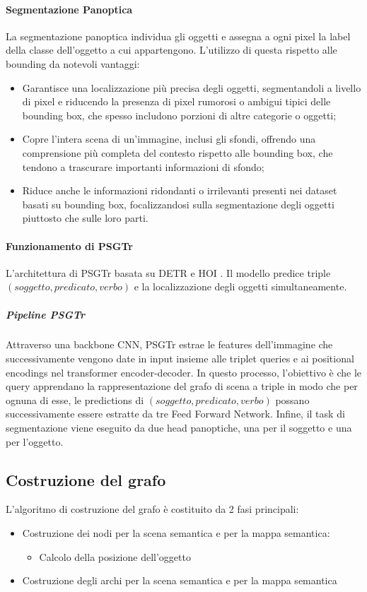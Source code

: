\paragraph*{Segmentazione Panoptica}
La segmentazione panoptica individua gli oggetti e assegna a ogni pixel la label della classe dell'oggetto a cui appartengono. L'utilizzo di questa rispetto alle bounding da notevoli vantaggi:
\begin{itemize}
  \item Garantisce una localizzazione più precisa degli oggetti, segmentandoli a livello di pixel e riducendo la presenza di pixel rumorosi o ambigui tipici delle bounding box, che spesso includono porzioni di altre categorie o oggetti;
  \item Copre l'intera scena di un'immagine, inclusi gli sfondi, offrendo una comprensione più completa del contesto rispetto alle bounding box, che tendono a trascurare importanti informazioni di sfondo;
  \item Riduce anche le informazioni ridondanti o irrilevanti presenti nei dataset basati su bounding box, focalizzandosi sulla segmentazione degli oggetti piuttosto che sulle loro parti.
\end{itemize}
\paragraph*{Funzionamento di PSGTr}
L'architettura di PSGTr basata su DETR \cite{detr} e HOI \cite{hoi}. Il modello predice triple $(soggetto, predicato, verbo)$ e la localizzazione degli oggetti simultaneamente.
\subparagraph*{Pipeline PSGTr}
Attraverso una \gls{backbone} CNN, PSGTr estrae le features dell'immagine che successivamente vengono date in input insieme alle triplet queries e ai positional encodings nel transformer encoder-decoder. In questo processo, l'obiettivo è che le query apprendano la rappresentazione del grafo di scena a triple in modo che per ognuna di esse, le predictions di  $(soggetto, predicato, verbo)$ possano successivamente essere estratte da tre Feed Forward Network. Infine, il task di segmentazione viene eseguito da due head panoptiche, una per il soggetto e una per l'oggetto.

\subsection{Costruzione del grafo}
L'algoritmo di costruzione del grafo è costituito da 2 fasi principali:
\begin{itemize}
  \item Costruzione dei nodi per la scena semantica e per la mappa semantica:
  \begin{itemize}
    \item Calcolo della posizione dell'oggetto
  \end{itemize}
  \item Costruzione degli archi per la scena semantica e per la mappa semantica
\end{itemize}

